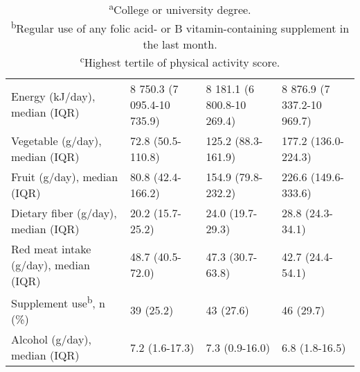 \begin{table}
\begin{adjustbox}{width=\textwidth}
\begin{tabular}{L{4.8cm}C{3.5cm}C{3.5cm}C{3.5cm}}
Energy (kJ/day), median (IQR) & 8 750.3 (7 095.4-10 735.9) & 8 181.1 (6 800.8-10 269.4) & 8 876.9 (7 337.2-10 969.7)\\
Vegetable (g/day), median (IQR) & 72.8 (50.5-110.8) & 125.2 (88.3-161.9) & 177.2 (136.0-224.3)\\
Fruit (g/day), median (IQR) & 80.8 (42.4-166.2) & 154.9 (79.8-232.2) & 226.6 (149.6-333.6)\\
Dietary fiber (g/day), median (IQR) & 20.2 (15.7-25.2) & 24.0 (19.7-29.3) & 28.8 (24.3-34.1)\\
Red meat intake (g/day), median (IQR) & 48.7 (40.5-72.0) & 47.3 (30.7-63.8) & 42.7 (24.4-54.1)\\
{Supplement use}\textsuperscript{b}{, n (\%)} & 39 (25.2) & 43 (27.6) & 46 (29.7)\\
 Alcohol (g/day), median (IQR) & 7.2 (1.6-17.3) & 7.3 (0.9-16.0) & 6.8 (1.8-16.5)\\
\hline
\end{tabular}
\end{adjustbox}
\caption*{\footnotesize{\textsuperscript{a}College or university degree.\\\textsuperscript{b}Regular use of any folic acid- or B vitamin-containing supplement in the last month.\\\textsuperscript{c}Highest tertile of physical activity score.}}
\end{table}

